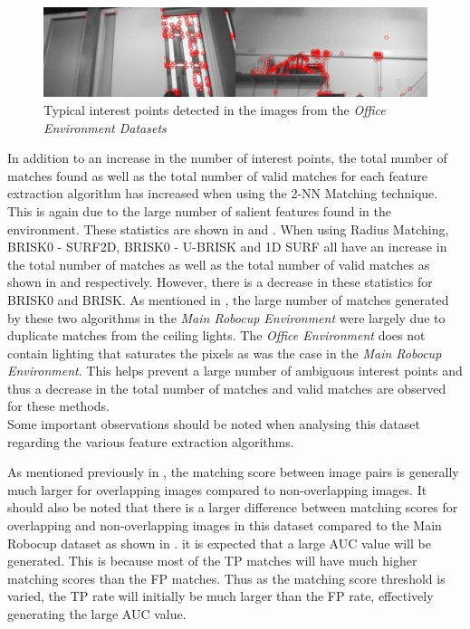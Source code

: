 \documentclass{report}
\begin{document}
\begin{figure}
  \centering
    \includegraphics[width=1.0\textwidth]{../Drawings/Matching/dataset2_interestPoints.jpg}
    \caption{Typical interest points detected in the images from the \textit{Office Environment Datasets}} 
    \label{fig:oe_interestPoints}
\end{figure}


In addition to an increase in the number of interest points, the total number of matches found as well as the total number of valid matches for each feature extraction algorithm has increased when using the 2-NN Matching technique. This is again due to the large number of salient features found in the environment. These statistics are shown in  and . When using Radius Matching, BRISK0 - SURF2D, BRISK0 - U-BRISK and 1D SURF all have an increase in the total number of matches as well as the total number of valid matches as shown in  and  respectively. However, there is a decrease in these statistics for BRISK0 and BRISK. As mentioned in , the large number of matches generated by these two algorithms in the \textit{Main Robocup Environment} were largely due to duplicate matches from the ceiling lights. The \textit{Office Environment} does not contain lighting that saturates the pixels as was the case in the \textit{Main Robocup Environment}. This helps prevent a large number of ambiguous interest points and thus a decrease in the total number of matches and valid matches are observed for these methods.\\ 


Some important observations should be noted when analysing this dataset regarding the various feature extraction algorithms. 

As mentioned previously in , the matching score between image pairs is generally much larger for overlapping images compared to non-overlapping images. It should also be noted that there is a larger difference between matching scores for overlapping and non-overlapping images in this dataset compared to the Main Robocup dataset as shown in . it is expected that a large AUC value will be generated. This is because most of the TP matches will have much higher matching scores than the FP matches. Thus as the matching score threshold is varied, the TP rate will initially be much larger than the FP rate, effectively generating the large AUC value. \\
\end{document}
